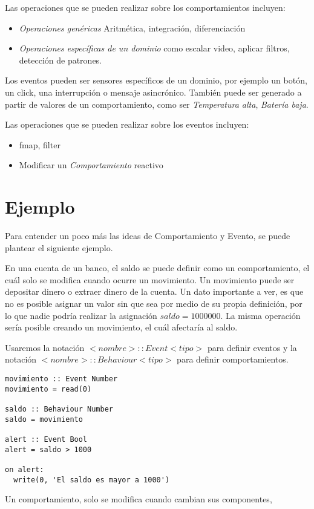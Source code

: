 Las operaciones que se pueden realizar sobre los comportamientos incluyen:
\begin{itemize}
\item \textit{Operaciones genéricas} Aritmética, integración, diferenciación
\item \textit{Operaciones específicas de un dominio} como escalar video, aplicar filtros, detección de patrones.
\end{itemize}

Los eventos pueden ser sensores específicos de un dominio, por ejemplo un
botón, un click, una interrupción o mensaje asincrónico.
También puede ser generado a partir de valores de un comportamiento,
como ser \emph{Temperatura alta}, \emph{Batería baja}.

Las operaciones que se pueden realizar sobre los eventos incluyen:
\begin{itemize}
\item fmap, filter
\item Modificar un \emph{Comportamiento} reactivo
\end{itemize}


\section{Ejemplo}

Para entender un poco más las ideas de Comportamiento y Evento, se puede
plantear el siguiente ejemplo.

  En una cuenta de un banco, el saldo se puede definir
como un comportamiento, el cuál solo se modifica cuando ocurre
un movimiento.
  Un movimiento puede ser depositar dinero o extraer
dinero de la cuenta.
  Un dato importante a ver, es que no es posible asignar un valor
sin que sea por medio de su propia definición, por lo que nadie
podría realizar la asignación $saldo = 1000000$.
  La misma operación sería posible creando un movimiento, el cuál
afectaría al saldo.

  Usaremos la notación $<nombre> :: Event <tipo>$ para definir
eventos y la notación $<nombre> :: Behaviour <tipo>$ para
definir comportamientos.

\begin{verbatim}
movimiento :: Event Number
movimiento = read(0)

saldo :: Behaviour Number
saldo = movimiento

alert :: Event Bool
alert = saldo > 1000

on alert:
  write(0, 'El saldo es mayor a 1000')

\end{verbatim}

Un comportamiento, solo se modifica cuando cambian sus componentes,





